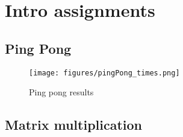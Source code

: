 \setcounter{section}{-1}
\section{Intro assignments}
\subsection{Ping Pong}

\begin{figure}[h]
    \centering
    \texttt{[image: figures/pingPong\_times.png]}
    \caption{Ping pong results}
    \label{fig:pingpong}
\end{figure}


\subsection{Matrix multiplication}

